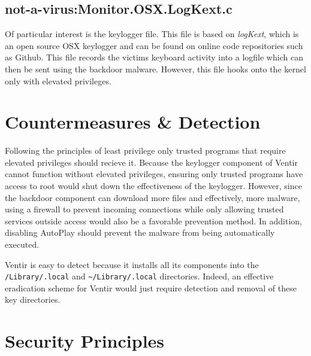 \documentclass[conference]{IEEEtran}
\begin{document}
\subsection{not-a-virus:Monitor.OSX.LogKext.c}
Of particular interest is the keylogger file. This file is based on
\textit{logKext}, which is an open source OSX keylogger and can be found on
online code repositories such as Github\cite{logkext}. This file records the
victims keyboard activity into a logfile which can then be sent using the
backdoor malware. However, this file hooks onto the kernel only with elevated
privileges\cite{erwin_ventir_2014}.

\section{Countermeasures \& Detection}

Following the principles of least privilege only trusted programs that require
elevated privileges should recieve it. Because the keylogger component of Ventir
cannot function without elevated privileges, ensuring only trusted programs have
access to root would shut down the effectiveness of the keylogger.  However,
since the backdoor component can download more files and effectively, more
malware, using a firewall to prevent incoming connections while only allowing
trusted services outside access would also be a favorable prevention method. In
addition, disabling AutoPlay should prevent the malware from being automatically
executed.

Ventir is easy to detect because it installs all its components into the
\lstinline[basicstyle=\ttfamily]|/Library/.local| and
\lstinline[basicstyle=\ttfamily]|~/Library/.local| directories. Indeed, an
effective eradication scheme for Ventir would just require detection and removal
of these key directories\cite{salmela_roll}.

\section{Security Principles}

\printbibliography

\end{document}
